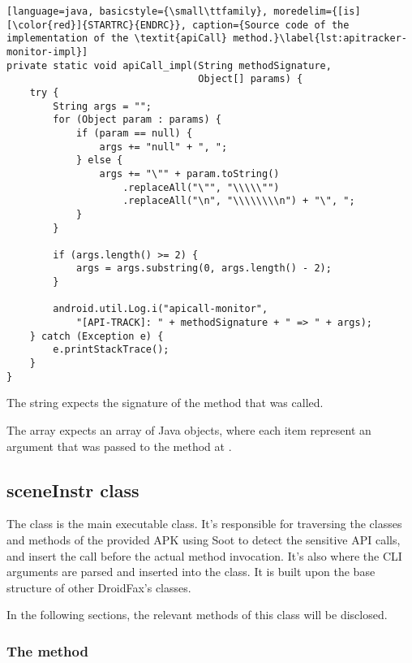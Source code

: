 \begin{lstlisting}[language=java, basicstyle={\small\ttfamily}, moredelim={[is][\color{red}]{STARTRC}{ENDRC}}, caption={Source code of the implementation of the \textit{apiCall} method.}\label{lst:apitracker-monitor-impl}]
private static void apiCall_impl(String methodSignature, 
                                 Object[] params) {
    try {
        String args = "";
        for (Object param : params) {
            if (param == null) {
                args += "null" + ", ";
            } else {
                args += "\"" + param.toString()
                    .replaceAll("\"", "\\\\\"")
                    .replaceAll("\n", "\\\\\\\\n") + "\", ";
            }
        }

        if (args.length() >= 2) {
            args = args.substring(0, args.length() - 2);
        }

        android.util.Log.i("apicall-monitor", 
            "[API-TRACK]: " + methodSignature + " => " + args);
    } catch (Exception e) {
        e.printStackTrace();
    }
}
\end{lstlisting}

The  string expects the signature of the method that was called. 

The  array expects an array of Java objects, where each item represent an argument that was passed to the method at .

\subsection{sceneInstr class}

The  class is the main executable class. It's responsible for traversing the classes and methods of the provided APK using Soot to detect the sensitive API calls, and insert the  call before the actual method invocation. It's also where the CLI arguments are parsed and inserted into the  class. It is built upon the base structure of other DroidFax's  classes.

In the following sections, the relevant methods of this class will be disclosed.

\subsubsection{The  method}

